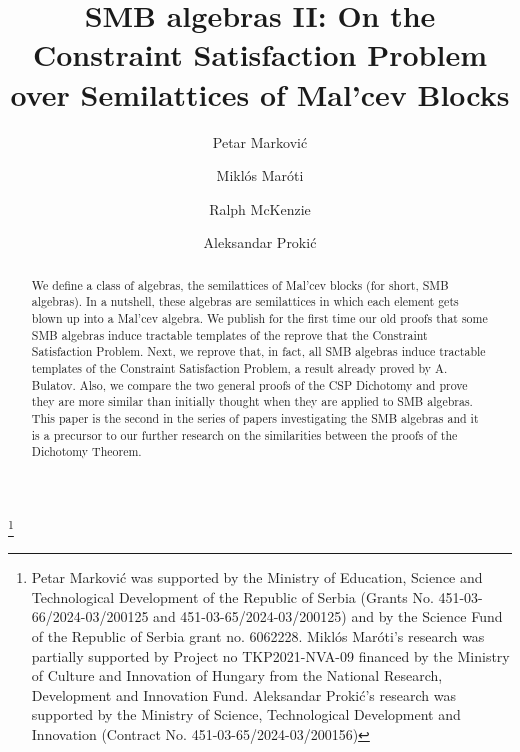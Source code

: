 \documentclass[11pt]{amsart}
\theoremstyle{definition}
\begin{document}
\title[SMB algebras II]{SMB algebras II: On the Constraint Satisfaction Problem over Semilattices of Mal'cev Blocks}
\author[P. Markovi\'c]{Petar Markovi\'c}
\address{Department of Mathematics and Informatics\\ 
University of Novi Sad\\ Serbia}
\author[M. Mar\'oti]{Mikl\'os Mar\'oti}
\address{Bolyai Institute\\
University of Szeged, Hungary}
\author[R. McKenzie]{Ralph McKenzie}
\address{Department of Mathematics\\ 
Vanderbilt University\\ Nashville, TN 37240, USA}
\author[A. Proki\'c]{Aleksandar Proki\'{c}}
\address{Faculty of Technical Sciences\\ 
University of Novi Sad\\ Serbia}
\thanks{
Petar Markovi\'c was supported by the Ministry of Education, Science and Technological Development of the Republic of Serbia (Grants No. 451-03-66/2024-03/200125 and 451-03-65/2024-03/200125) and by the Science Fund of the Republic of Serbia grant no. 6062228. Mikl\'os Mar\'oti's research was partially supported by Project no TKP2021-NVA-09 financed by the Ministry of Culture and Innovation of Hungary from the National Research, Development and Innovation Fund. Aleksandar Proki\'{c}'s research was supported by the Ministry of Science, Technological Development and Innovation (Contract No. 451-03-65/2024-03/200156)
}

\begin{abstract}
We define a class of algebras, the semilattices of Mal'cev blocks (for short, SMB algebras). In a nutshell, these algebras are semilattices in which each element gets blown up into a Mal'cev algebra. We publish for the first time our old proofs that some SMB algebras induce tractable templates of the reprove that the Constraint Satisfaction Problem. Next, we reprove that, in fact, all SMB algebras induce tractable templates of the Constraint Satisfaction Problem, a result already proved by A. Bulatov. Also, we compare the two general proofs of the CSP Dichotomy and prove they are more similar than initially thought when they are applied to SMB algebras. This paper is the second in the series of papers investigating the SMB algebras and it is a precursor to our further research on the similarities between the proofs of the Dichotomy Theorem.
\end{abstract}
\end{document}
